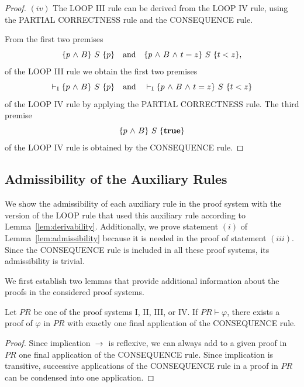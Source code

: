 \documentclass[manuscript, screen, review]{acmart}
\begin{document}
\begin{proof}
\NI
$(iv)$
The {\rm LOOP III} rule can be derived from the {\rm LOOP IV} rule, using 
   the {\rm PARTIAL CORRECTNESS} rule and the {\rm CONSEQUENCE} rule.

From the first two premises
\[
  \mbox{$\{{p \mbox{$\ \wedge\ $} B}\}\ {S}\ \{{p}\}$}
\quad
\mbox{\rm and} \quad
   \mbox{$\{{p \mbox{$\ \wedge\ $} B \mbox{$\ \wedge\ $} t=z}\}\ {S}\ \{{t<z}\}$},
\]
of the LOOP III rule
we obtain the first two premises
$$\vdash_{\rm{I}}  \mbox{$\{{p \mbox{$\ \wedge\ $} B}\}\ {S}\ \{{p}\}$}
\quad
\mbox{\rm and} \quad \vdash_{\rm{I}}  \mbox{$\{{p \mbox{$\ \wedge\ $} B \mbox{$\ \wedge\ $} t=z}\}\ {S}\ \{{t<z}\}$}$$
of the LOOP IV rule
by applying the PARTIAL CORRECTNESS rule.
The third premise
\[
  \mbox{$\{{p \mbox{$\ \wedge\ $} B}\}\ {S}\ \{{\mathbf{true}}\}$}
\]
of the LOOP IV rule is obtained by the CONSEQUENCE rule.
\end{proof}


\subsection{Admissibility of the Auxiliary Rules}
\label{subsec:proof-admissibility}

We show the admissibility of each auxiliary rule in the proof system
with the version of the LOOP rule that used this auxiliary rule 
according to Lemma~\ref{lem:derivability}. 
Additionally, we prove statement $(i)$ of Lemma~\ref{lem:admissibility} 
because it is needed in the proof of statement $(iii)$.
Since the CONSEQUENCE rule is included in all these proof systems,
its admissibility is trivial.

We first establish two lemmas that provide additional
information about the proofs in the considered proof systems.

\begin{lemma} \label{lemma:1}
Let $\mathit{PR}$ be one of the proof systems I, II, III, or IV.
If $\mathit{PR} \vdash \varphi$, there exists a proof of $\varphi$ in $\mathit{PR}$ 
with exactly one final application of the CONSEQUENCE rule.
\end{lemma}

\begin{proof}
Since implication $\mbox{$\:\rightarrow\:$}$ is reflexive, we can always add to a given proof in $\mathit{PR}$
one final application of the CONSEQUENCE rule.
Since implication is transitive, successive applications of the CONSEQUENCE rule in a proof in $\mathit{PR}$
can be condensed into one application.
\end{proof} 
\end{document}
